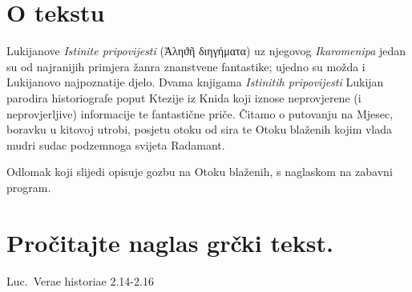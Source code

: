 


\section*{O tekstu}

Lukijanove \textit{Istinite pripovijesti} \textgreek[variant=ancient]{(Ἀληϑῆ διηγήματα)} uz njegovog \textit{Ikaromenipa} jedan su od najranijih primjera žanra znanstvene fantastike; ujedno su možda i Lukijanovo najpoznatije djelo. Dvama knjigama \textit{Istinitih pripovijesti} Lukijan parodira historiografe poput Ktezije iz Knida koji iznose neprovjerene (i neprovjerljive) informacije te fantastične priče. Čitamo o putovanju na Mjesec, boravku u kitovoj utrobi, posjetu otoku od sira te Otoku blaženih kojim vlada mudri sudac podzemnoga svijeta Radamant. 

Odlomak koji slijedi opisuje gozbu na Otoku blaženih, s naglaskom na zabavni program.


\section*{Pročitajte naglas grčki tekst.}

Luc.\ Verae historiae 2.14-2.16


\medskip


